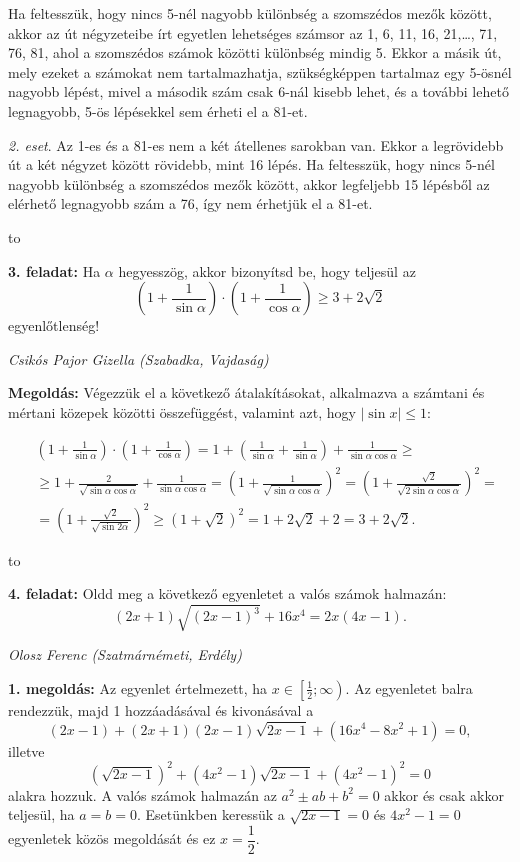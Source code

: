 \documentclass[a4paper,10pt]{article}
\newcommand{\ki}[2]{\hfill {\it #1 (#2)}\medskip}
\newcommand{\vonal}{\hbox to \hsize{\hskip2truecm\hrulefill\hskip2truecm}}
\begin{document}
Ha feltesszük, hogy nincs 5-nél nagyobb különbség a szomszédos mezők között, akkor az út négyzeteibe írt egyetlen lehetséges számsor az 1, 6, 11, 16, 21,\ldots, 71, 76, 81, ahol a szomszédos számok közötti különbség mindig 5. Ekkor a másik út, mely ezeket a számokat nem tartalmazhatja, szükségképpen tartalmaz egy 5-ösnél nagyobb lépést, mivel a második szám csak 6-nál kisebb lehet, és a további lehető legnagyobb, 5-ös lépésekkel sem érheti el a 81-et.

\textit{2. eset}.  Az 1-es és a 81-es nem a két átellenes sarokban van. Ekkor a legrövidebb út a két négyzet között rövidebb, mint 16 lépés. Ha feltesszük, hogy nincs 5-nél nagyobb különbség a szomszédos mezők között, akkor legfeljebb 15 lépésből az elérhető legnagyobb szám a 76, így nem érhetjük el a 81-et.

\vonal


{\bf 3. feladat: } Ha $\alpha$ hegyesszög, akkor bizonyítsd be, hogy teljesül az
$$\left(1+\frac{1}{\sin \alpha}\right)\cdot\left(1+\frac{1}{\cos \alpha}\right)\ge 3+2\sqrt 2$$
egyenlőtlenség!

\ki{Csikós Pajor Gizella}{Szabadka, Vajdaság}\medskip

{\bf Megoldás: } Végezzük el a következő átalakításokat, alkalmazva a számtani és mértani közepek közötti összefüggést, valamint azt, hogy 
$|\sin x|\le 1$:

\begin{align*}
~&\left(1+\frac{1}{\sin \alpha}\right)\cdot
\left(1+\frac{1}{\cos \alpha}\right)=
1+\left(\frac{1}{\sin \alpha}+\frac{1}{\sin \alpha}\right)+\frac{1}{\sin \alpha \cos \alpha}\ge\\
&\ge 1+\frac{2}{\sqrt{\sin \alpha \cos \alpha}}+
\frac{1}{\sin \alpha \cos \alpha} =
\left(1+\frac{1}{\sqrt{\sin \alpha \cos \alpha}}\right)^2 =
\left(1+\frac{\sqrt 2}{\sqrt{2\sin \alpha \cos \alpha}}\right)^2=\\
&=\left(1+\frac{\sqrt 2}{\sqrt{\sin 2\alpha}}\right)^2\ge (1+\sqrt 2)^2=1+2\sqrt 2+2 =
3+2\sqrt 2.
\end{align*}

\vonal


{\bf 4. feladat: } Oldd meg a következő egyenletet a valós számok halmazán:
$$(2x+1)\sqrt{(2x-1)^3}+16x^4=2x(4x-1).$$

\ki{Olosz Ferenc}{Szatmárnémeti, Erdély}\medskip

{\bf 1. megoldás: } Az egyenlet értelmezett, ha 
$x\in\left[\frac{1}{2};\infty\right)$.
Az egyenletet balra rendezzük, majd 1 hozzáadásával és kivonásával a
$$(2x-1)+(2x+1)(2x-1)\sqrt{2x-1}+(16x^4-8x^2+1)=0,$$
illetve
$$\left(\sqrt{2x-1}\right)^2+(4x^2-1)\sqrt{2x-1}+
(4x^2-1)^2=0$$
alakra hozzuk. 
A valós számok halmazán az $a^2\pm ab+b^2=0$  akkor és csak akkor teljesül, ha $a=b=0$. Esetünkben keressük a $\sqrt{2x-1}=0$ és $4x^2-1=0$ egyenletek közös megoldását és ez $x=\dfrac{1}{2}$.
\end{document}

